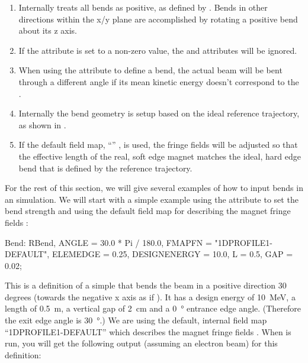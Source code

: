 \begin{enumerate}
\item Internally \opalt treats all bends as positive, as defined by .
      Bends in other directions within the x/y plane are accomplished by rotating a positive bend
      about its z axis.
\item If the  attribute is set to a non-zero value, the  and  attributes
  will be ignored.
\item When using the  attribute to define a bend, the actual beam will be bent through
  a different angle if its mean kinetic energy doesn't correspond to the .
\item Internally the bend geometry is setup based on the ideal reference trajectory, as shown in
  .\item If the default field map, ``''
 , is used, the fringe fields will be adjusted
  so that the effective length of the real, soft edge magnet matches the ideal, hard edge bend that is
  defined by the reference trajectory.
\end{enumerate}

For the rest of this section, we will give several examples of how to input bends in an \opalt
simulation. We will start with a simple example using the
 attribute to set the bend strength and using the default field map 
 for describing the magnet fringe fields :

\begin{example}
Bend: RBend, ANGLE = 30.0 * Pi / 180.0,
	     FMAPFN = "1DPROFILE1-DEFAULT",
	     ELEMEDGE = 0.25,
	     DESIGNENERGY = 10.0,
	     L = 0.5,
	     GAP = 0.02;
\end{example}
This is a definition of a simple  that bends the beam in a positive direction 30 degrees (towards
the negative x axis as if ). It has a design energy of \SI{10}{\mega\electronvolt}, a length of \SI{0.5}{\meter}, a
vertical gap of \SI{2}{\centi\meter} and a \SI{0}{\degree} entrance edge angle. (Therefore the exit edge angle is \SI{30}{\degree}.) We are
using the default, internal field map ``1DPROFILE1-DEFAULT'' 
 which describes the magnet fringe fields . When \opal is run, you will
get the following output (assuming an electron beam) for this  definition:

